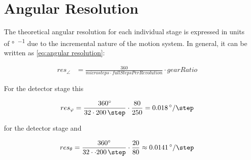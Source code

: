     \section{Angular Resolution}\label{sec:angular resolution}
        The theoretical angular resolution for each individual stage is expressed in units of \unit{\degree\per\step} due to the incremental nature of the motion system.
        In general, it can be written as \cref{eq:angular resolution}:

        \begin{align}
            res_{\angle} &= \frac{360}{microsteps \cdot fullStepsPerRevolution} \cdot gearRatio
            \label{eq:angular resolution}
        \end{align}

        For the detector stage this 

        \begin{align}
            res_{\varphi} = \frac{\qty{360}{\degree}}{32 \cdot \qty{200}{\step}} \cdot \frac{80}{250} = \qty{0.018}{\degree\per\step}
        \end{align}

        for the detector stage and

        \begin{align}
            res_{\theta} = \frac{\qty{360}{\degree}}{32 \cdot \cdot \qty{200}{\step}} \cdot \frac{20}{80} \approx \qty{0.0141}{\degree\per\step}
        \end{align}